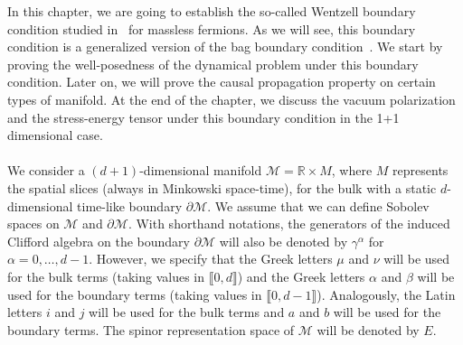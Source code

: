 In this chapter, we are going to establish the so-called Wentzell boundary condition studied in~\cite{Zahn2016} for massless fermions.
As we will see, this boundary condition is a generalized version of the bag boundary condition~\cite{Chodos1974}.
We start by proving the well-posedness of the dynamical problem under this boundary condition. 
Later on, we will prove the causal propagation property on certain types of manifold.
At the end of the chapter, 
we discuss the vacuum polarization and the stress-energy tensor under this boundary condition in the 1+1 dimensional case.
\\\\
We consider a $(d+1)$-dimensional manifold $\mathcal{M} = \mathbb{R}\times M$, where $M$ represents the spatial slices (always in Minkowski space-time), for the bulk with a static $d$-dimensional time-like boundary $\partial \mathcal{M}$.
We assume that we can define Sobolev spaces on $\mathcal{M}$ and $\partial \mathcal{M}$.
%
With shorthand notations, the generators of the induced Clifford algebra on the boundary $\partial \mathcal{M}$ will also be denoted by $\gamma^\alpha$ for $\alpha = 0 ,\ldots, d-1$. 
However, we specify that the Greek letters $\mu$ and $\nu$ will be used for the bulk terms (taking values in $\llbracket 0, d \rrbracket$) and the Greek letters $\alpha$ and $\beta$ will be used for the boundary terms (taking values in $\llbracket 0, d-1 \rrbracket$).
Analogously, the Latin letters $i $ and $j$ will be used for the bulk terms and $a$ and $b$ will be used for the boundary terms. 
The spinor representation space of $\mathcal{M}$ will be denoted by $E$.
%

